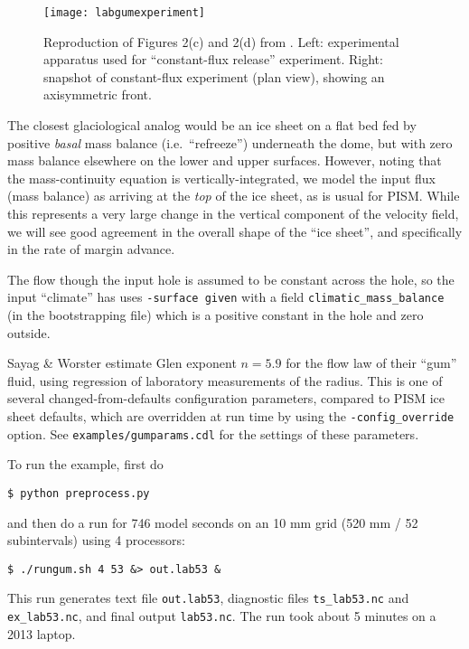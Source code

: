 \begin{figure}[ht]
\centering
\texttt{[image: labgumexperiment]}
\caption{Reproduction of Figures 2(c) and 2(d) from \cite{SayagWorster2013}.  Left: experimental  apparatus used for ``constant-flux release'' experiment.  Right: snapshot of constant-flux
experiment (plan view), showing an axisymmetric front.}
\label{fig:labgumexperiment}
\end{figure}

The closest glaciological analog would be an ice sheet on a flat bed fed by positive \emph{basal} mass balance (i.e.~``refreeze'') underneath the dome, but with zero mass balance elsewhere on the lower and upper surfaces.  However, noting that the mass-continuity equation is vertically-integrated, we model the input flux (mass balance) as arriving at the \emph{top} of the ice sheet, as is usual for PISM.  While this represents a very large change in the vertical component of the velocity field, we will see good agreement in the overall shape of the ``ice sheet'', and specifically in the rate of margin advance.

The flow though the input hole is assumed to be constant across the hole, so the input ``climate'' has uses \texttt{-surface given} with a field \texttt{climatic_mass_balance} (in the bootstrapping file) which is a positive constant in the hole and zero outside.

Sayag \& Worster estimate Glen exponent $n = 5.9$ for the flow law of their ``gum'' fluid, using regression of laboratory measurements of the radius.  This is one of several changed-from-defaults configuration parameters, compared to PISM ice sheet defaults, which are overridden at run time by using the \texttt{-config_override} option.  See \texttt{examples/gumparams.cdl} for the settings of these parameters.

To run the example, first do
\begin{verbatim}
$ python preprocess.py
\end{verbatim}%
and then do a run for 746 model seconds \cite{SayagWorster2013} on an 10 mm grid (520 mm / 52 subintervals) using 4 processors:
\begin{verbatim}
$ ./rungum.sh 4 53 &> out.lab53 &
\end{verbatim}%
This run generates text file \texttt{out.lab53}, diagnostic files \texttt{ts_lab53.nc} and \texttt{ex_lab53.nc}, and final output \texttt{lab53.nc}.  The run took about 5 minutes on a 2013 laptop.

